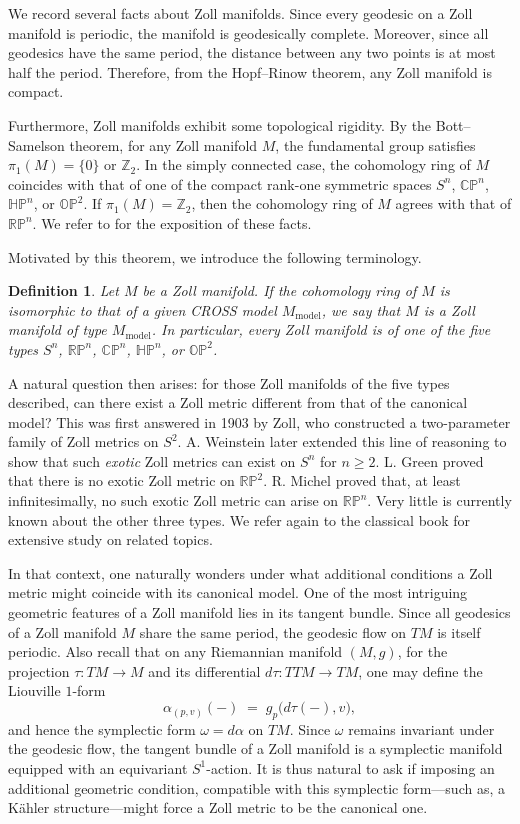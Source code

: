 \documentclass[a4paper, 12pt]{article}
\newcommand{\bR}{\mathbb{R}}
\newcommand{\bP}{\mathbb{P}}
\newtheorem{defn}[thm]{Definition}
\begin{document}
We record several facts about Zoll manifolds. Since every geodesic on a Zoll manifold is periodic, the manifold is geodesically complete.
Moreover, since all geodesics have the same period, the distance between any two points is at most half the period. Therefore, from the Hopf--Rinow theorem, any Zoll manifold is compact.

Furthermore, Zoll manifolds exhibit some topological rigidity. By the Bott--Samelson theorem, for any Zoll manifold $M$, the fundamental group satisfies $\pi_1(M) = \{0\}$ or $\mathbb{Z}_2$. In the simply connected case, the cohomology ring of $M$ coincides with that of one of the compact rank-one symmetric spaces $S^n$, $\mathbb{CP}^n$, $\mathbb{HP}^n$, or $\mathbb{OP}^2$. If $\pi_1(M) = \mathbb{Z}_2$, then the cohomology ring of $M$ agrees with that of $\mathbb{RP}^n$. We refer to \cite[Chapter 7. D]{B12} for the exposition of these facts. 

Motivated by this theorem, we introduce the following terminology.
\begin{defn}
Let $M$ be a Zoll manifold. If the cohomology ring of $M$ is isomorphic to that of a given CROSS model $M_{\mathrm{model}}$, we say that $M$ is a \emph{Zoll manifold of type $M_{\mathrm{model}}$}. In particular, every Zoll manifold is of one of the five types $S^n$, $\mathbb{RP}^n$, $\mathbb{CP}^n$, $\mathbb{HP}^n$, or $\mathbb{OP}^2$.
\end{defn}

A natural question then arises: for those Zoll manifolds of the five types described, can there exist a Zoll metric different from that of the canonical model? This was first answered in 1903 by Zoll, who constructed a two-parameter family of Zoll metrics on $S^2$. A. Weinstein later extended this line of reasoning to show that such \emph{exotic} Zoll metrics can exist on $S^n$ for $n\ge 2$. L. Green proved that there is no exotic Zoll metric on $\bR\bP^2$. R. Michel proved that,  at least infinitesimally,  no such exotic Zoll metric can arise on $\mathbb{RP}^n$. Very little is currently known about the other three types. We refer again to the classical book \cite{B12} for extensive study on related topics. 

In that context, one naturally wonders under what additional conditions a Zoll metric might coincide with its canonical model. One of the most intriguing geometric features of a Zoll manifold lies in its tangent bundle. Since all geodesics of a Zoll manifold $M$ share the same period, the geodesic flow on $TM$ is itself periodic. Also recall that on any Riemannian manifold $(M,g)$, for the projection $\tau:TM\to M$ and its differential $d\tau:TTM \to TM$, one may define the Liouville $1$-form
\[
\alpha_{(p,v)}(-) \;=\; g_p\bigl(d\tau(-),v\bigr),
\]
and hence the symplectic form $\omega=d\alpha$ on $TM$. Since $\omega$ remains invariant under the geodesic flow, the tangent bundle of a Zoll manifold is a symplectic manifold equipped with an equivariant $S^1$-action. It is thus natural to ask if imposing an additional geometric condition, compatible with this symplectic form---such as, a K\"ahler structure---might force a Zoll metric to be the canonical one. 
\end{document}
